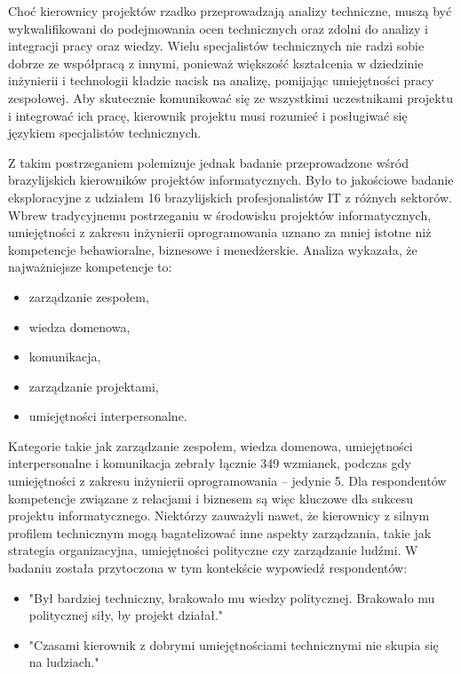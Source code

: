 Choć kierownicy projektów rzadko przeprowadzają analizy techniczne, muszą być wykwalifikowani do podejmowania ocen technicznych oraz zdolni do analizy i integracji pracy oraz wiedzy. Wielu specjalistów technicznych nie radzi sobie dobrze ze współpracą z innymi, ponieważ większość kształcenia w dziedzinie inżynierii i technologii kładzie nacisk na analizę, pomijając umiejętności pracy zespołowej. Aby skutecznie komunikować się ze wszystkimi uczestnikami projektu i integrować ich pracę, kierownik projektu musi rozumieć i posługiwać się językiem specjalistów technicznych.\autocite{NicholasSteyn}

Z takim postrzeganiem polemizuje jednak badanie przeprowadzone wśród brazylijskich kierowników projektów informatycznych.\autocite{silva2015project} Było to jakościowe badanie eksploracyjne z udziałem 16 brazylijskich profesjonalistów IT z różnych sektorów.
Wbrew tradycyjnemu postrzeganiu w środowisku projektów informatycznych, umiejętności z zakresu inżynierii oprogramowania uznano za mniej istotne niż kompetencje behawioralne, biznesowe i menedżerskie. Analiza wykazała, że najważniejsze kompetencje to:
\begin{itemize}
    \item zarządzanie zespołem,
    \item wiedza domenowa,
    \item komunikacja,
    \item zarządzanie projektami,
    \item umiejętności interpersonalne.
\end{itemize}
\autocite{silva2015project}

Kategorie takie jak zarządzanie zespołem, wiedza domenowa, umiejętności interpersonalne i komunikacja zebrały łącznie 349 wzmianek, podczas gdy umiejętności z zakresu inżynierii oprogramowania – jedynie 5. Dla respondentów kompetencje związane z relacjami i biznesem są więc kluczowe dla sukcesu projektu informatycznego. Niektórzy zauważyli nawet, że kierownicy z silnym profilem technicznym mogą bagatelizować inne aspekty zarządzania, takie jak strategia organizacyjna, umiejętności polityczne czy zarządzanie ludźmi. W badaniu została przytoczona w tym kontekście wypowiedź respondentów:
\begin{itemize}
    \item"Był bardziej techniczny, brakowało mu wiedzy politycznej. Brakowało mu politycznej siły, by projekt działał."
    \item"Czasami kierownik z dobrymi umiejętnościami technicznymi nie skupia się na ludziach." 
\end{itemize}

